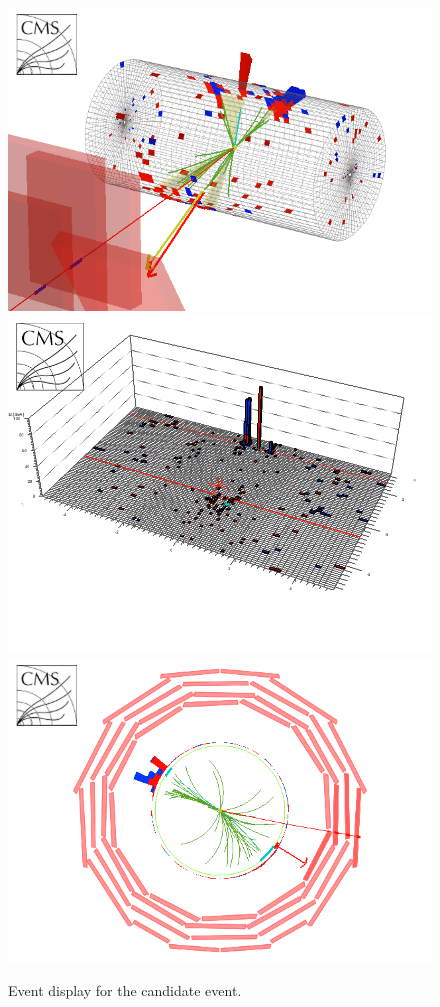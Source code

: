 \begin{figure}[tbh]
\begin{center}
\includegraphics[width=0.6\linewidth]{OSG_3D.png}
\includegraphics[width=0.6\linewidth]{OSG_lego.png}
\includegraphics[width=0.6\linewidth]{OSG_rphi.png}
\caption{\label{fig:cand1}Event display for the candidate event.}
\end{center}
\end{figure}

\clearpage
